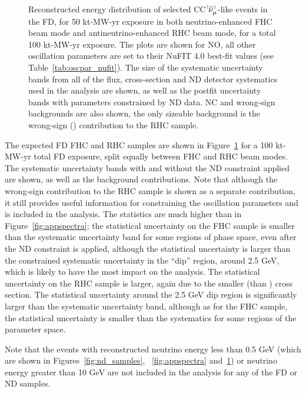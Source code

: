 \begin{figure}[htbp]
  \\
\caption{Reconstructed energy distribution of selected CC $\nu^{\bracketbar}_{\mu}$-like events in the FD, for 50 kt-MW-yr exposure in both neutrino-enhanced FHC beam mode and antineutrino-enhanced RHC beam mode, for a total 100 kt-MW-yr exposure. The plots are shown for NO, all other oscillation parameters are set to their NuFIT 4.0 best-fit values (see Table~\ref{tab:oscpar_nufit}). The size of the systematic uncertainty bands from all of the flux, cross-section and ND detector systematics used in the analysis are shown, as well as the postfit uncertainty bands with parameters constrained by ND data. NC and wrong-sign backgrounds are also shown, the only sizeable background is the wrong-sign (\numu) contribution to the RHC sample.}
\label{fig:disspectra}
\end{figure}
The expected FD FHC \numu and RHC \anumu samples are shown in Figure~\ref{fig:disspectra} for a 100 kt-MW-yr total FD exposure, split equally between FHC and RHC beam modes. The systematic uncertainty bands with and without the ND constraint applied are shown, as well as the background contributions. Note that although the wrong-sign \numu contribution to the RHC \anumu sample is shown as a separate contribution, it still provides useful information for constraining the oscillation parameters and is included in the analysis. The statistics are much higher than in Figure~\ref{fig:appspectra}; the statistical uncertainty on the \numu FHC sample is smaller than the systematic uncertainty band for some regions of phase space, even after the ND constraint is applied, although the statistical uncertainty is larger than the constrained systematic uncertainty in the ``dip'' region, around 2.5 GeV, which is likely to have the most impact on the analysis. The statistical uncertainty on the \anumu RHC sample is larger, again due to the smaller \anumu (than \numu) cross section. The statistical uncertainty around the 2.5 GeV dip region is significantly larger than the systematic uncertainty band, although as for the FHC \numu sample, the statistical uncertainty is smaller than the systematics for some regions of the parameter space.

Note that the events with reconstructed neutrino energy less than 0.5 GeV (which are shown in Figures~\ref{fig:nd_samples}, ~\ref{fig:appspectra} and~\ref{fig:disspectra}) or neutrino energy greater than 10 GeV are not included in the analysis for any of the FD or ND samples.



